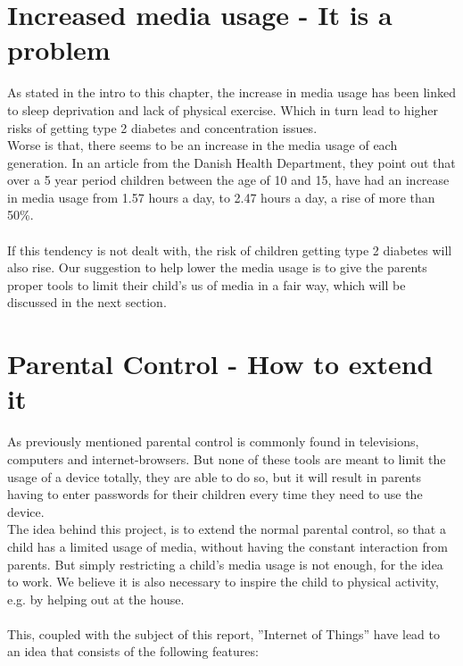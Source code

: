 \section{Increased media usage - It is a problem}
As stated in the intro to this chapter, the increase in media usage has been linked to sleep deprivation and lack of physical exercise. Which in turn lead to higher risks of getting type 2 diabetes and concentration issues.\\
Worse is that, there seems to be an increase in the media usage of each generation. In an article from the Danish Health Department, they point out that over a 5 year period children between the age of 10 and 15, have had an increase in media usage from 1.57 hours a day, to 2.47 hours a day, a rise of more than 50\%.\citep{sundhedsstyrelsen}\\
\\
If this tendency is not dealt with, the risk of children getting type 2 diabetes will also rise. Our suggestion to help lower the media usage is to give the parents proper tools to limit their child’s us of media in a fair way, which will be discussed in the next section.


\section{Parental Control - How to extend it}
\label{section:pcHowToExtend}
As previously mentioned parental control is commonly found in televisions, computers and internet-browsers. But none of these tools are meant to limit the usage of a device totally, they are able to do so, but it will result in parents having to enter passwords for their children every time they need to use the device. \\
The idea behind this project, is to extend the normal parental control, so that a child has a limited usage of media, without having the constant interaction from parents. 
But simply restricting a child's media usage is not enough, for the idea to work. We believe it is also necessary to inspire the child to physical activity, e.g. by helping out at the house.\\
\\
This, coupled with the subject of this report, ''Internet of Things'' have lead to an idea that consists of the following features:

